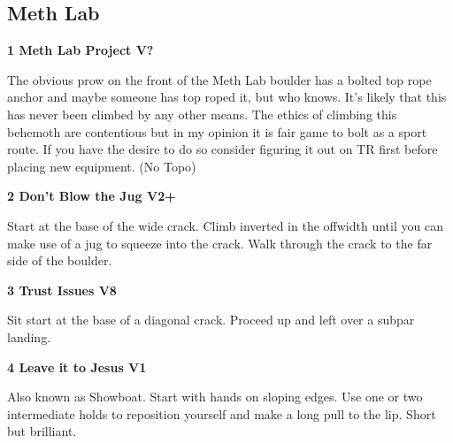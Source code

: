 	\begin{multicols}{2}


\needspace{1.5cm}
\subsection*{Meth Lab}\label{bf:Meth Lab}
	


\needspace{1.5cm}
\label{rt:Meth Lab Project}
\colorbox{black!20}{
\parbox{0.95\linewidth}{
\textbf{
1 Meth Lab Project V?  \warn\warn\warn
}}}
\begin{adjustwidth}{0.5cm}{}			
The obvious prow on the front of the Meth Lab boulder has a bolted top rope anchor and maybe someone has top roped it, but who knows. It's likely that this has never been climbed by any other means. The ethics of climbing this behemoth are contentious but in my opinion it is fair game to bolt as a sport route. If you have the desire to do so consider figuring it out on TR first before placing new equipment.
  (No Topo)
\end{adjustwidth}




\needspace{1.5cm}
\label{rt:Don't Blow the Jug}
\colorbox{green!20}{
\parbox{0.95\linewidth}{
\textbf{
2 Don't Blow the Jug V2+  \warn
}}}
\begin{adjustwidth}{0.5cm}{}			
Start at the base of the wide crack. Climb inverted in the offwidth until you can make use of a jug to squeeze into the crack. Walk through the crack to the far side of the boulder.
\end{adjustwidth}




\needspace{1.5cm}
\label{rt:Trust Issues}
\colorbox{Goldenrod!20}{
\parbox{0.95\linewidth}{
\textbf{
3 Trust Issues V8  \warn\warn
}}}
\begin{adjustwidth}{0.5cm}{}			
Sit start at the base of a diagonal crack. Proceed up and left over a subpar landing.
\end{adjustwidth}




\needspace{1.5cm}
\label{rt:Leave it to Jesus}
\colorbox{green!20}{
\parbox{0.95\linewidth}{
\textbf{
4 Leave it to Jesus V1  
}}}
\begin{adjustwidth}{0.5cm}{}			
Also known as Showboat. Start with hands on sloping edges. Use one or two intermediate holds to reposition yourself and make a long pull to the lip. Short but brilliant.
\end{adjustwidth}



\end{multicols}
